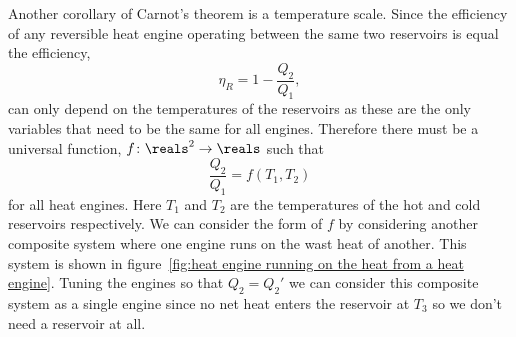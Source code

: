     Another corollary of Carnot's theorem is a temperature scale.
    Since the efficiency of any reversible heat engine operating between the same two reservoirs is equal the efficiency,
    \[\eta_R = 1 - \frac{Q_2}{Q_1},\]
    can only depend on the temperatures of the reservoirs as these are the only variables that need to be the same for all engines.
    Therefore there must be a universal function, \(f\colon\reals^2 \to \reals\) such that
    \[\frac{Q_2}{Q_1} = f(T_1, T_2)\]
    for all heat engines.
    Here \(T_1\) and \(T_2\) are the temperatures of the hot and cold reservoirs respectively.
    We can consider the form of \(f\) by considering another composite system where one engine runs on the wast heat of another.
    This system is shown in figure~\ref{fig:heat engine running on the heat from a heat engine}.
    Tuning the engines so that \(Q_2 = Q_2'\) we can consider this composite system as a single engine since no net heat enters the reservoir at \(T_3\) so we don't need a reservoir at all.
